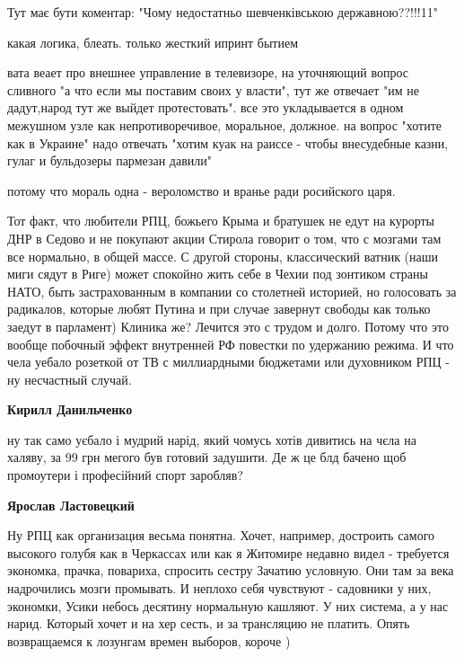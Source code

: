 \begin{itemize}
Тут має бути коментар:
"Чому недостатньо шевченківською державною??!!!11"


какая логика, блеать. только жесткий ипринт бытием

вата веает про внешнее управление в телевизоре, на уточняющий вопрос сливного
"а что если мы поставим своих у власти", тут же отвечает "им не дадут,народ тут
же выйдет протестовать". все это укладывается в одном межушном узле как
непротиворечивое, моральное, должное. на вопрос "хотите как в Украине" надо
отвечать "хотим куак на раиссе - чтобы внесудебные казни, гулаг и бульдозеры
пармезан давили"

потому что мораль одна - вероломство и вранье ради росийского царя.


Тот факт, что любители РПЦ, божьего Крыма и братушек не едут на курорты ДНР в
Седово и не покупают акции Стирола говорит о том, что с мозгами там все
нормально, в общей массе. С другой стороны, классический ватник (наши миги
сядут в Риге) может спокойно жить себе в Чехии под зонтиком страны НАТО, быть
застрахованным в компании со столетней историей, но голосовать за радикалов,
которые любят Путина и при случае завернут свободы как только заедут в
парламент) Клиника же? Лечится это с трудом и долго. Потому что это вообще
побочный эффект внутренней РФ повестки по удержанию режима. И что чела уебало
розеткой от ТВ с миллиардными бюджетами или духовником РПЦ - ну несчастный
случай.

\begin{itemize} %
\textbf{Кирилл Данильченко} 

ну так само уєбало і мудрий нарід, який чомусь хотів дивитись на чєла на
халяву, за 99 грн мегого був готовий задушити. Де ж це блд бачено щоб
промоутери і професійний спорт заробляв?

\textbf{Ярослав Ластовецкий} 

Ну РПЦ как организация весьма понятна. Хочет, например, достроить самого
высокого голубя как в Черкассах или как я Житомире недавно видел - требуется
экономка, прачка, повариха, спросить сестру Зачатию условную. Они там за века
надрочились мозги промывать. И неплохо себя чувствуют - садовники у них,
экономки, Усики небось десятину нормальную кашляют. У них система, а у нас
нарид. Который хочет и на хер сесть, и за трансляцию не платить. Опять
возвращаемся к лозунгам времен выборов, короче )


\end{itemize}
\end{itemize}
